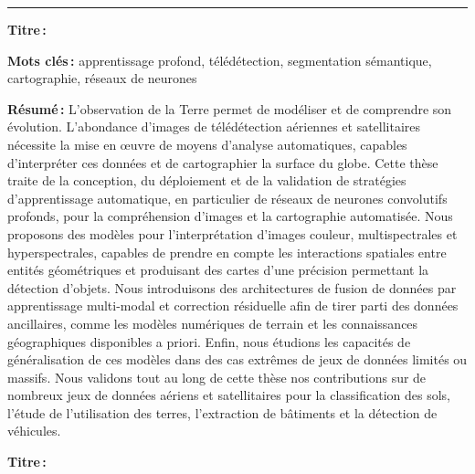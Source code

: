 {\begin{titlepage}
\begin{minipage}{0.2\textwidth}
\end{minipage}
\vspace*{2.3cm}

{\color{rulepink}\rule{\textwidth}{0.2cm}}

\bigskip

\begin{minipage}{\textwidth}
\large{}\selectfont
{\color{textpink} \textbf{Titre\,:}}~~\@title

\bigskip

\textbf{Mots clés\,:} apprentissage profond, télédétection, segmentation sémantique, cartographie, réseaux de neurones
\begin{multicols}{2}
\textbf{Résumé\,:}
L'observation de la Terre permet de modéliser et de comprendre son évolution. L'abondance d'images de télédétection aériennes et satellitaires nécessite la mise en œuvre de moyens d'analyse automatiques, capables d'interpréter ces données et de cartographier la surface du globe. Cette thèse traite de la conception, du déploiement et de la validation de stratégies d'apprentissage automatique, en particulier de réseaux de neurones convolutifs profonds, pour la compréhension d'images et la cartographie automatisée. Nous proposons des modèles pour l'interprétation d'images couleur, multispectrales et hyperspectrales, capables de prendre en compte les interactions spatiales entre entités géométriques et produisant des cartes d'une précision permettant la détection d'objets. Nous introduisons des architectures de fusion de données par apprentissage multi-modal et correction résiduelle afin de tirer parti des données ancillaires, comme les modèles numériques de terrain et les connaissances géographiques disponibles a priori. Enfin, nous étudions les capacités de généralisation de ces modèles dans des cas extrêmes de jeux de données limités ou massifs. Nous validons tout au long de cette thèse nos contributions sur de nombreux jeux de données aériens et satellitaires pour la classification des sols, l'étude de l'utilisation des terres, l'extraction de bâtiments et la détection de véhicules.

\end{multicols}
\end{minipage}
\vspace{4em}

\bigskip

\begin{minipage}{\textwidth}
\large{}\selectfont
{\color{textpink} \textbf{Titre\,:}}~~\@titleen


\end{minipage}
\end{titlepage}}
